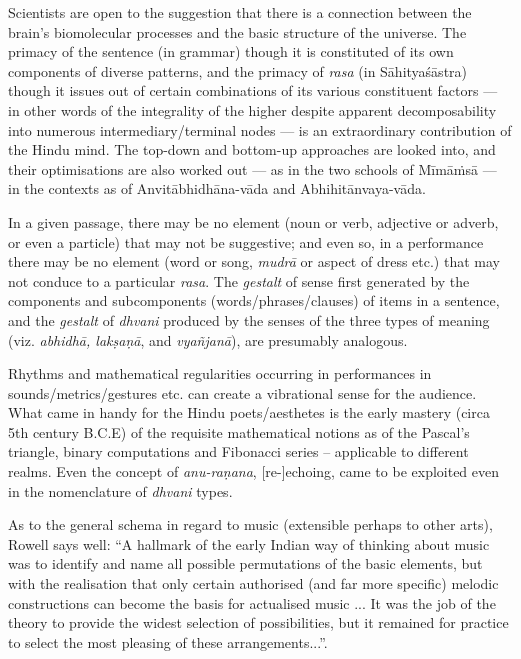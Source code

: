 Scientists are open to the suggestion that there is a connection between the brain's biomolecular processes and the basic structure of the universe. The primacy of the sentence (in grammar) though it is constituted of its own components of diverse patterns, and the primacy of \textsl{rasa} (in Sāhityaśāstra) though it issues out of certain combinations of its various constituent factors --- in other words of the integrality of the higher despite apparent decomposability into numerous intermediary/terminal nodes --- is an extraordinary contribution of the Hindu mind. The top-down and bottom-up approaches are looked into, and their optimisations are also worked out --- as in the two schools of Mīmāṁsā --- in the contexts as of Anvitābhidhāna-vāda and Abhihitānvaya-vāda.

In a given passage, there may be no element (noun or verb, adjective or adverb, or even a particle) that may not be suggestive; and even so, in a performance there may be no element (word or song, \textsl{mudrā} or aspect of dress etc.) that may not conduce to a particular \textsl{rasa}.
 The \textsl{gestalt} of sense first generated by the components and subcomponents (words/phrases/clauses) of items in a sentence, and the \textsl{gestalt} of \textsl{dhvani} produced by the senses of the three types of meaning (viz. \textsl{abhidhā, lakṣaṇā}, and \textsl{vyañjanā}), are presumably analogous.

Rhythms and mathematical regularities occurring in performances in sounds/metrics/gestures etc. can create a vibrational sense for the audience. What came in handy for the Hindu poets/aesthetes is the early mastery (circa 5th century B.C.E) of the requisite mathematical notions as of the Pascal’s triangle, binary computations and Fibonacci series -- applicable to different realms. Even the concept of \textsl{anu-raṇana}, [re-]echoing, came to be exploited even in the nomenclature of \textsl{dhvani} types. 

As to the general schema in regard to music (extensible perhaps to other arts), Rowell says well: “A hallmark of the early Indian way of thinking about music was to identify and name all possible permutations of the basic elements, but with the realisation that only certain authorised (and far more specific) melodic constructions can become the basis for actualised music ... It was the job of the theory to provide the widest selection of possibilities, but it remained for practice to select the most pleasing of these arrangements...”.


